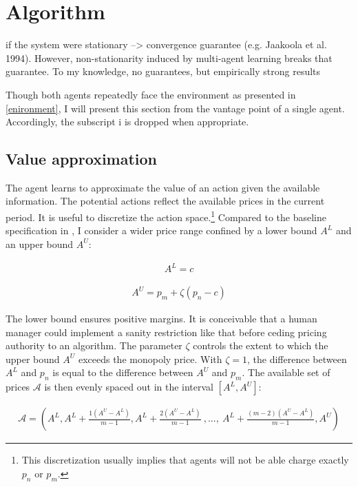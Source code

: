 \section{Algorithm}\label{algorithm}

if the system were stationary --> convergence guarantee (e.g. Jaakoola et al. 1994). However, non-stationarity induced by multi-agent learning breaks that guarantee. To my knowledge, no guarantees, but empirically strong results

Though both agents repeatedly face the environment as presented in \autoref{enironment}, I will present this section from the vantage point of a single agent. Accordingly, the subscript {i} is dropped when appropriate.

\subsection{Value approximation}\label{value_approximation}

The agent learns to approximate the value of an action given the available information. The potential actions reflect the available prices in the current period. It is useful to discretize the action space.\footnote{This discretization usually implies that agents will not be able charge exactly $p_n$ or $p_m$.} Compared to the baseline specification in \textcite{calvano_artificial_2019}, I consider a wider price range confined by a lower bound $A^L$ and an upper bound $A^U$:

\begin{gather}
A^{L} = c
\end{gather}

\begin{gather}
A^{U} = p_m + \zeta (p_n - c)
\end{gather}

The lower bound ensures positive margins. It is conceivable that a human manager could implement a sanity restriction like that before ceding pricing authority to an algorithm. The parameter $\zeta$ controls the extent to which the upper bound $A^U$ exceeds the monopoly price. With $\zeta = 1$, the difference between $A^{L}$ and $p_n$ is equal to the difference between $A^{U}$ and $p_m$. The available set of prices $\mathcal{A}$ is then evenly spaced out in the interval $[A^L, A^U]$:

\begin{gather}\label{available_prices}
	\mathcal{A} = (A^L, A^L + \frac{1(A^U - A^L)}{m-1}, A^L + \frac{2(A^U - A^L)}{m-1}~ , ... , ~ A^L + \frac{(m-2)(A^U - A^L)}{m-1}, A^U)
\end{gather}

